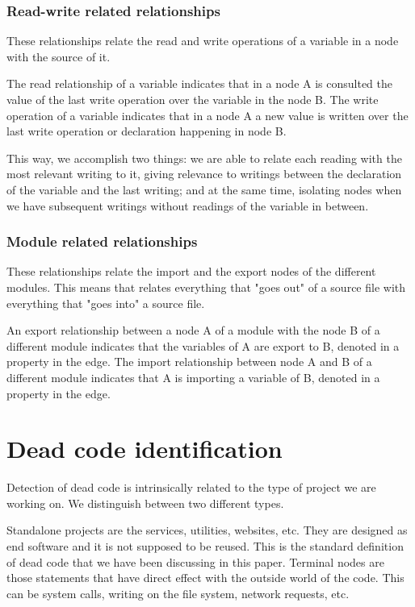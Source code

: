 \documentclass{uvamscse}
\begin{document}

\subsubsection{Read-write related relationships}
These relationships relate the read and write operations of a variable in a node with the source of it. 

The read relationship of a variable indicates that in a node A is consulted the value of the last write operation over the variable in the node B. The write operation of a variable indicates that in a node A a new value is written over the last write operation or declaration happening in node B. 

This way, we accomplish two things: we are able to relate each reading with the most relevant writing to it, giving relevance to writings between the declaration of the variable and the last writing; and at the same time, isolating nodes when we have subsequent writings without readings of the variable in between.

\subsubsection{Module related relationships}
These relationships relate the import and the export nodes of the different modules. This means that relates everything that "goes out" of a source file with everything that "goes into" a source file.

An export relationship between a node A of a module with the node B of a different module indicates that the variables of A are export to B, denoted in a property in the edge. The import relationship between node A and B of a different module indicates that A is importing a variable of B, denoted in a property in the edge.

\section{Dead code identification}
Detection of dead code is intrinsically related to the type of project we are working on. We distinguish between two different types.

Standalone projects are the services, utilities, websites, etc. They are designed as end software and it is not supposed to be reused. This is the standard definition of dead code that we have been discussing in this paper. Terminal nodes are those statements that have direct effect with the outside world of the code. This can be system calls, writing on the file system, network requests, etc.
\end{document}

